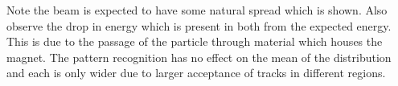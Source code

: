 Note the beam is expected to have some natural spread which is shown. Also observe the drop in energy which is present in both from the expected energy. This is due to the passage of the particle through material which houses the magnet. The pattern recognition has no effect on the mean of the distribution and each is only wider due to larger acceptance of tracks in different regions.  

\begin{figure}[H]
\hspace{-2.5cm}

\end{figure}
